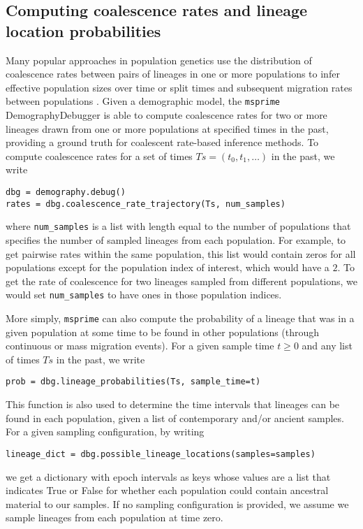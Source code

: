 \documentclass{article}
\begin{document}
\subsection*{Computing coalescence rates and lineage location probabilities}
Many popular approaches in population genetics use the distribution of coalescence rates between 
pairs of lineages in one or more populations to infer effective population sizes over time 
\cite{li2011inference,sheehan2013estimating,schiffels2014inferring}
or split times 
and subsequent migration rates between populations 
\cite{wang2020tracking}.
Given a demographic model, the 
\texttt{msprime} DemographyDebugger is able to compute coalescence rates for two or more lineages drawn 
from one or more populations at specified times in the past, providing a ground truth for coalescent rate-based 
inference methods. To compute coalescence rates for a set of times $Ts=(t_0, t_1, \ldots)$ in the 
past, we write
\begin{lstlisting}[frame=single]
dbg = demography.debug()
rates = dbg.coalescence_rate_trajectory(Ts, num_samples)
\end{lstlisting}
where \texttt{num\_samples} is a list with length equal to the number of populations that
specifies the number of sampled lineages from each population. For example, 
to get pairwise rates within the same 
population, this list would contain zeros for all populations except for the population index of interest, 
which would have a $2$. To get the rate of coalescence for two lineages sampled from different 
populations, we would set \texttt{num\_samples} to have ones in those population indices.

More simply, \texttt{msprime} can also compute the probability of a lineage that was in a given
population at some time to be found in other populations (through continuous or mass migration events). 
For a given sample time $t\geq0$ and any list of times $Ts$ in the past, we write
\begin{lstlisting}[frame=single]
prob = dbg.lineage_probabilities(Ts, sample_time=t)
\end{lstlisting}
This function is also used to determine the time intervals that lineages can be found in each population,
given a list of contemporary and/or ancient samples. For a given sampling configuration, by writing
\begin{lstlisting}[frame=single]
lineage_dict = dbg.possible_lineage_locations(samples=samples)
\end{lstlisting}
we get a dictionary with epoch intervals as keys whose values are a list that indicates True or False for 
whether each population could contain ancestral material to our samples.
If no sampling configuration is provided, we assume we sample lineages from each population at time zero.
\end{document}
